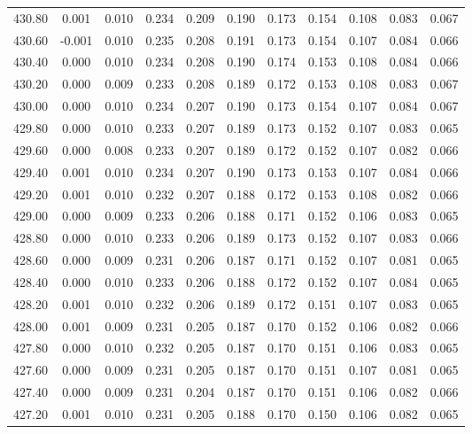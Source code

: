 \begin{longtable}{cccccccccc}
    430.80 &  0.001 &  0.010 &  0.234 &  0.209 &  0.190 &  0.173 &  0.154 &  0.108 &  0.083 &  0.067 \\
    430.60 & -0.001 &  0.010 &  0.235 &  0.208 &  0.191 &  0.173 &  0.154 &  0.107 &  0.084 &  0.066 \\
    430.40 &  0.000 &  0.010 &  0.234 &  0.208 &  0.190 &  0.174 &  0.153 &  0.108 &  0.084 &  0.066 \\
    430.20 &  0.000 &  0.009 &  0.233 &  0.208 &  0.189 &  0.172 &  0.153 &  0.108 &  0.083 &  0.067 \\
    430.00 &  0.000 &  0.010 &  0.234 &  0.207 &  0.190 &  0.173 &  0.154 &  0.107 &  0.084 &  0.067 \\
    429.80 &  0.000 &  0.010 &  0.233 &  0.207 &  0.189 &  0.173 &  0.152 &  0.107 &  0.083 &  0.065 \\
    429.60 &  0.000 &  0.008 &  0.233 &  0.207 &  0.189 &  0.172 &  0.152 &  0.107 &  0.082 &  0.066 \\
    429.40 &  0.001 &  0.010 &  0.234 &  0.207 &  0.190 &  0.173 &  0.153 &  0.107 &  0.084 &  0.066 \\
    429.20 &  0.001 &  0.010 &  0.232 &  0.207 &  0.188 &  0.172 &  0.153 &  0.108 &  0.082 &  0.066 \\
    429.00 &  0.000 &  0.009 &  0.233 &  0.206 &  0.188 &  0.171 &  0.152 &  0.106 &  0.083 &  0.065 \\
    428.80 &  0.000 &  0.010 &  0.233 &  0.206 &  0.189 &  0.173 &  0.152 &  0.107 &  0.083 &  0.066 \\
    428.60 &  0.000 &  0.009 &  0.231 &  0.206 &  0.187 &  0.171 &  0.152 &  0.107 &  0.081 &  0.065 \\
    428.40 &  0.000 &  0.010 &  0.233 &  0.206 &  0.188 &  0.172 &  0.152 &  0.107 &  0.084 &  0.065 \\
    428.20 &  0.001 &  0.010 &  0.232 &  0.206 &  0.189 &  0.172 &  0.151 &  0.107 &  0.083 &  0.065 \\
    428.00 &  0.001 &  0.009 &  0.231 &  0.205 &  0.187 &  0.170 &  0.152 &  0.106 &  0.082 &  0.066 \\
    427.80 &  0.000 &  0.010 &  0.232 &  0.205 &  0.187 &  0.170 &  0.151 &  0.106 &  0.083 &  0.065 \\
    427.60 &  0.000 &  0.009 &  0.231 &  0.205 &  0.187 &  0.170 &  0.151 &  0.107 &  0.081 &  0.065 \\
    427.40 &  0.000 &  0.009 &  0.231 &  0.204 &  0.187 &  0.170 &  0.151 &  0.106 &  0.082 &  0.066 \\
    427.20 &  0.001 &  0.010 &  0.231 &  0.205 &  0.188 &  0.170 &  0.150 &  0.106 &  0.082 &  0.065 \\

\end{longtable}

